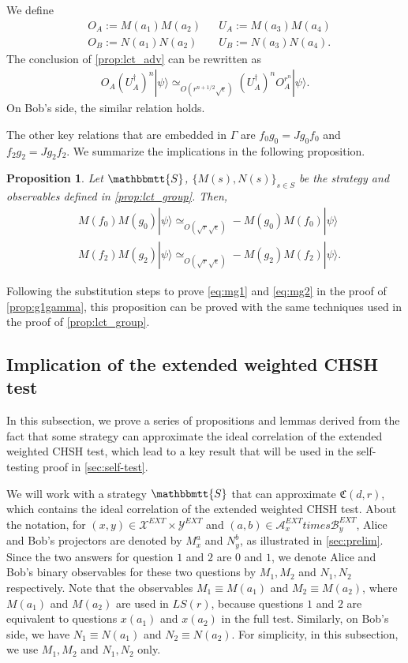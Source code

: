 \documentclass[11pt,letterpaper]{article}
\newcommand{\ket}[1]{|#1\rangle}
\newcommand{\ct}{^{\dagger}}
\newcommand{\calX}{\mathcal{X}}
\newcommand{\calY}{\mathcal{Y}}
\newcommand{\calA}{\mathcal{A}}
\newcommand{\calB}{\mathcal{B}}
\newcommand{\1}{\mathbb{1}}
\newcommand{\EXT}{EXT}
\newcommand{\LS}{LS}
\newcommand{\fC}{\mathfrak{C}}
\newcommand{\bS}{\mathbbmtt{S}}
\newcommand{\se}{\sqrt{\epsilon}}
\newcommand{\sr}{\sqrt{r}}
\newcommand{\appd}[1]{\simeq_{#1}}
\newtheorem{proposition}[theorem]{Proposition}
\theoremstyle{definition}
\begin{document}
We define 
\begin{align}
    \label{eq:uaoa} & O_A := M(a_1)M(a_2) && U_A := M(a_3)M(a_4) \\
    \label{eq:ubob} & O_B := N(a_1)N(a_2) && U_B := N(a_3)N(a_4).
\end{align}
The conclusion of \cref{prop:lct_adv} can be rewritten as 
\begin{align*}
	 O_A (U_A\ct)^n \ket{\psi} \appd{O(r^{n+1/2} \se)} (U_A\ct)^n O_A^{r^n} \ket{\psi}.
\end{align*}
On Bob's side, the similar relation holds.

The other key relations that are embedded in $\Gamma$ are 
$f_0g_0 = Jg_0f_0$ and $f_2g_2 = Jg_2 f_2$.
We summarize the implications in the following proposition.
\begin{proposition}
	\label{prop:lct_comm}
	Let $\bS$, $\{M(s), N(s)\}_{s \in S}$ be the strategy and observables defined in \cref{prop:lct_group}.
	Then,
	\begin{align}
		&M(f_0)M(g_0) \ket{\psi} \appd{O(\sr \se)} -M(g_0)M(f_0) \ket{\psi} \\
		&M(f_2)M(g_2) \ket{\psi} \appd{O(\sr \se)} -M(g_2)M(f_2) \ket{\psi}.
	\end{align}
\end{proposition}
Following the substitution steps to prove \cref{eq:mg1} and \cref{eq:mg2} in the proof of \cref{prop:g1gamma},
this proposition can be proved with the same techniques used in the proof of \cref{prop:lct_group}.


\subsection{Implication of the extended weighted CHSH test}
\label{sec:imp_chsh}
In this subsection, we prove a series of propositions and lemmas 
derived from the fact that some strategy can approximate the ideal correlation of the extended weighted CHSH test,
which lead to a key result that will be
used in the self-testing proof in \cref{sec:self-test}.

We will work with a strategy $\bS$ that can approximate
$\fC(d,r)$, which contains
the ideal correlation of the extended weighted CHSH test.
About the notation,
for $(x,y) \in \calX^{\EXT} \times \calY^{\EXT}$ and $(a,b) \in \calA_x^{\EXT} times \calB_y^{\EXT}$, 
Alice and Bob's projectors are denoted 
by $M_x^a$ and $N_y^b$,
as illustrated in \cref{sec:prelim}.
Since the two answers for question $1$ and $2$ are $0$ and $1$, 
we denote Alice and Bob's binary observables for these two questions
by $M_1, M_2$ and $N_1, N_2$ respectively.
Note that the observables $M_1 \equiv M(a_1)$ and $M_2 \equiv M(a_2)$,
where $M(a_1)$ and $M(a_2)$ are used in $\LS(r)$,
because questions $1$ and $2$ are equivalent to questions $x(a_1)$ and $x(a_2)$ in the full test.  
Similarly, on Bob's side, we have $N_1 \equiv N(a_1)$ and $N_2 \equiv N(a_2)$.
For simplicity, in this subsection, we
use $M_1, M_2$ and $N_1, N_2$ only.
\end{document}
